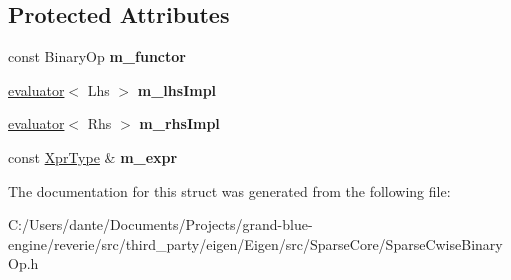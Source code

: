 \subsection*{Protected Attributes}
\begin{DoxyCompactItemize}
\item 
\mbox{\label{struct_eigen_1_1internal_1_1binary__evaluator_3_01_cwise_binary_op_3_01_binary_op_00_01_lhs_00_0e1df6e69b5cafbc50d80e8ad3bfd660e_aff8d0dc0c3e9dfa4191bbd4f69715657}} 
const Binary\+Op {\bfseries m\+\_\+functor}
\item 
\mbox{\label{struct_eigen_1_1internal_1_1binary__evaluator_3_01_cwise_binary_op_3_01_binary_op_00_01_lhs_00_0e1df6e69b5cafbc50d80e8ad3bfd660e_a99fa002c958af593f3b159c969cf1dc5}} 
\mbox{\hyperlink{struct_eigen_1_1internal_1_1evaluator}{evaluator}}$<$ Lhs $>$ {\bfseries m\+\_\+lhs\+Impl}
\item 
\mbox{\label{struct_eigen_1_1internal_1_1binary__evaluator_3_01_cwise_binary_op_3_01_binary_op_00_01_lhs_00_0e1df6e69b5cafbc50d80e8ad3bfd660e_a40f8ff8adeb2a32ddfd2184353314bca}} 
\mbox{\hyperlink{struct_eigen_1_1internal_1_1evaluator}{evaluator}}$<$ Rhs $>$ {\bfseries m\+\_\+rhs\+Impl}
\item 
\mbox{\label{struct_eigen_1_1internal_1_1binary__evaluator_3_01_cwise_binary_op_3_01_binary_op_00_01_lhs_00_0e1df6e69b5cafbc50d80e8ad3bfd660e_a9458aca3103f7de7c30ca71a7056ffcc}} 
const \mbox{\hyperlink{class_eigen_1_1_cwise_binary_op}{Xpr\+Type}} \& {\bfseries m\+\_\+expr}
\end{DoxyCompactItemize}


The documentation for this struct was generated from the following file\+:\begin{DoxyCompactItemize}
\item 
C\+:/\+Users/dante/\+Documents/\+Projects/grand-\/blue-\/engine/reverie/src/third\+\_\+party/eigen/\+Eigen/src/\+Sparse\+Core/Sparse\+Cwise\+Binary\+Op.\+h\end{DoxyCompactItemize}
